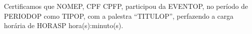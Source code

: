 Certificamos que NOMEP, CPF CPFP, participou da EVENTOP, no período de PERIODOP como TIPOP, com a palestra ``TITULOP'', perfazendo a carga horária de HORASP hora(s):minuto(s).
